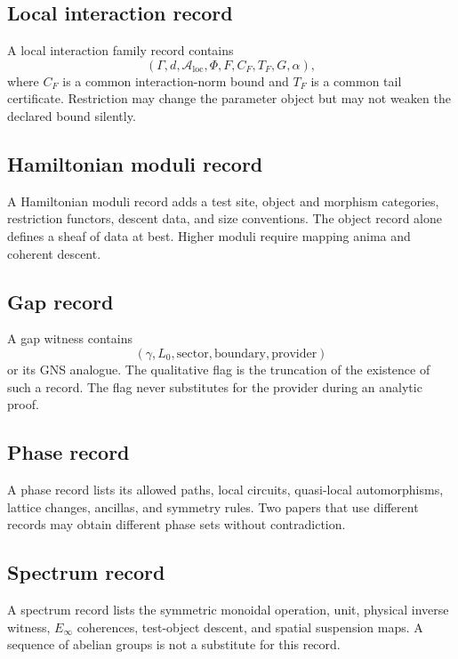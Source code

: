 \documentclass[12pt]{article}
\theoremstyle{definition}
\theoremstyle{remark}
\newcommand{\A}{\mathcal A}
\begin{document}
\subsection{Local interaction record}

A local interaction family record contains
\begin{equation}
(\Gamma,d,\A_{\mathrm{loc}},\Phi,F,C_F,T_F,G,\alpha),
\end{equation}
where $C_F$ is a common interaction-norm bound and $T_F$ is a common tail
certificate.  Restriction may change the parameter object but may not weaken
the declared bound silently.

\subsection{Hamiltonian moduli record}

A Hamiltonian moduli record adds a test site, object and morphism categories,
restriction functors, descent data, and size conventions.  The object record
alone defines a sheaf of data at best.  Higher moduli require mapping anima
and coherent descent.

\subsection{Gap record}

A gap witness contains
\begin{equation}
(\gamma,L_0,\text{sector},\text{boundary},\text{provider})
\end{equation}
or its GNS analogue.  The qualitative flag is the truncation of the existence
of such a record.  The flag never substitutes for the provider during an
analytic proof.

\subsection{Phase record}

A phase record lists its allowed paths, local circuits, quasi-local
automorphisms, lattice changes, ancillas, and symmetry rules.  Two papers
that use different records may obtain different phase sets without
contradiction.

\subsection{Spectrum record}

A spectrum record lists the symmetric monoidal operation, unit, physical
inverse witness, $E_\infty$ coherences, test-object descent, and spatial
suspension maps.  A sequence of abelian groups is not a substitute for this
record.
\end{document}
